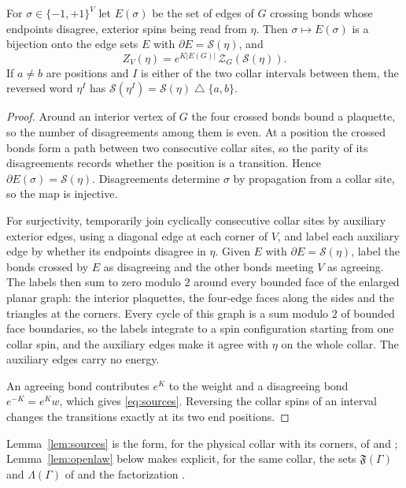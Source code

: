 \begin{lemma}\label{lem:sources}
For $\sigma\in\{-1,+1\}^V$ let $E(\sigma)$ be the set of edges of $G$ crossing bonds whose endpoints disagree, exterior spins being read from $\eta$. Then $\sigma\mapsto E(\sigma)$ is a bijection onto the edge sets $E$ with $\partial E=\mathcal S(\eta)$, and
\begin{equation}\label{eq:sources}
 Z_V(\eta)=e^{K|E(G)|}\,\mathcal Z_G(\mathcal S(\eta)).
\end{equation}
If $a\ne b$ are positions and $I$ is either of the two collar intervals between them, the reversed word $\eta^I$ has $\mathcal S(\eta^I)=\mathcal S(\eta)\mathbin{\triangle}\{a,b\}$.
\end{lemma}
\begin{proof}
Around an interior vertex of $G$ the four crossed bonds bound a plaquette, so the number of disagreements among them is even. At a position the crossed bonds form a path between two consecutive collar sites, so the parity of its disagreements records whether the position is a transition. Hence $\partial E(\sigma)=\mathcal S(\eta)$. Disagreements determine $\sigma$ by propagation from a collar site, so the map is injective.

For surjectivity, temporarily join cyclically consecutive collar sites by auxiliary exterior edges, using a diagonal edge at each corner of $V$, and label each auxiliary edge by whether its endpoints disagree in $\eta$. Given $E$ with $\partial E=\mathcal S(\eta)$, label the bonds crossed by $E$ as disagreeing and the other bonds meeting $V$ as agreeing. The labels then sum to zero modulo $2$ around every bounded face of the enlarged planar graph: the interior plaquettes, the four-edge faces along the sides and the triangles at the corners. Every cycle of this graph is a sum modulo $2$ of bounded face boundaries, so the labels integrate to a spin configuration starting from one collar spin, and the auxiliary edges make it agree with $\eta$ on the whole collar. The auxiliary edges carry no energy.

An agreeing bond contributes $e^K$ to the weight and a disagreeing bond $e^{-K}=e^Kw$, which gives \eqref{eq:sources}. Reversing the collar spins of an interval changes the transitions exactly at its two end positions.
\end{proof}
Lemma~\ref{lem:sources} is the form, for the physical collar with its corners, of \cite[(A.2)]{CV} and \cite[Lemma~6.2]{PV99}; Lemma~\ref{lem:openlaw} below makes explicit, for the same collar, the sets $\mathfrak F(\Gamma)$ and $\Lambda(\Gamma)$ of \cite[Appendix~A.2]{CV} and the factorization \cite[Lemma~6.4]{PV99}.

